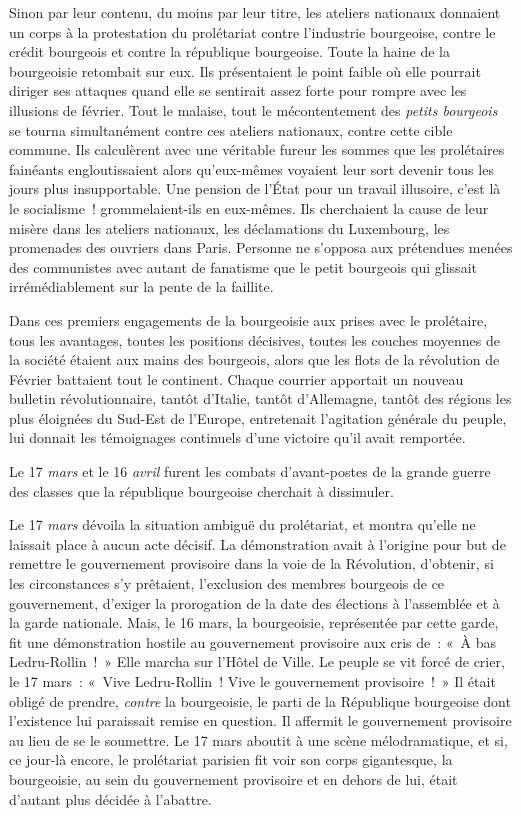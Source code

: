 \documentclass[twoside]{book} %
\begin{document}
Sinon par leur contenu, du moins par leur titre, les ateliers nationaux donnaient un corps à la protestation du prolétariat contre l’industrie bourgeoise, contre le crédit bourgeois et contre la république bourgeoise. Toute la haine de la bourgeoisie retombait sur eux. Ils présentaient le point faible où elle pourrait diriger ses attaques quand elle se sentirait assez forte pour rompre avec les illusions de février. Tout le malaise, tout le mécontentement des \emph{petits bourgeois} se tourna simultanément contre ces ateliers nationaux, contre cette cible commune. Ils calculèrent avec une véritable fureur les sommes que les prolétaires fainéants engloutissaient alors qu’eux-mêmes voyaient leur sort devenir tous les jours plus insupportable. Une pension de l’État pour un travail illusoire, c’est là le socialisme ! grommelaient-ils en eux-mêmes. Ils cherchaient la cause de leur misère dans les ateliers nationaux, les déclamations du Luxembourg, les promenades des ouvriers dans Paris. Personne ne s’opposa aux prétendues menées des communistes avec autant de fanatisme que le petit bourgeois qui glissait irrémédiablement sur la pente de la faillite.\par
Dans ces premiers engagements de la bourgeoisie aux prises avec le prolétaire, tous les avantages, toutes les positions décisives, toutes les couches moyennes de la société étaient aux mains des bourgeois, alors que les flots de la révolution de Février battaient tout le continent. Chaque courrier apportait un nouveau bulletin révolutionnaire, tantôt d’Italie, tantôt d’Allemagne, tantôt des régions les plus éloignées du Sud-Est de l’Europe, entretenait l’agitation générale du peuple, lui donnait les témoignages continuels d’une victoire qu’il avait remportée.\par
Le 17 \emph{mars} et le 16 \emph{avril} furent les combats d’avant-postes de la grande guerre des classes que la république bourgeoise cherchait à dissimuler.\par
Le 17 \emph{mars} dévoila la situation ambiguë du prolétariat, et montra qu’elle ne laissait place à aucun acte décisif. La démonstration avait à l’origine pour but de remettre le gouvernement provisoire dans la voie de la Révolution, d’obtenir, si les circonstances s’y prêtaient, l’exclusion des membres bourgeois de ce gouvernement, d’exiger la prorogation de la date des élections à l’assemblée et à la garde nationale. Mais, le 16 mars, la bourgeoisie, représentée par cette garde, fit une démonstration hostile au gouvernement provisoire aux cris de : « À bas Ledru-Rollin ! » Elle marcha sur l’Hôtel de Ville. Le peuple se vit forcé de crier, le 17 mars : « Vive Ledru-Rollin ! Vive le gouvernement provisoire ! » Il était obligé de prendre, \emph{contre} la bourgeoisie, le parti de la République bourgeoise dont l’existence lui paraissait remise en question. Il affermit le gouvernement provisoire au lieu de se le soumettre. Le 17 mars aboutit à une scène mélodramatique, et si, ce jour-là encore, le prolétariat parisien fit voir son corps gigantesque, la bourgeoisie, au sein du gouvernement provisoire et en dehors de lui, était d’autant plus décidée à l’abattre.\par
\end{document}
